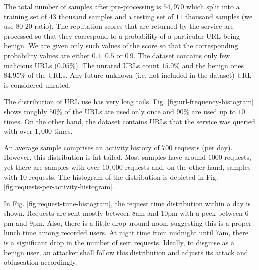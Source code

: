 The total number of samples after pre-processing is $54,970$ which split into a training set of $43$ thousand samples and a testing set of $11$ thousand samples (we use $80$-$20$ ratio). The reputation scores that are returned by the service are processed so that they correspond to a probability of a particular URL being benign. We are given only such values of the score so that the corresponding probability values are either $0.1$, $0.5$ or $0.9$. The dataset contains only few malicious URLs
($0.05\%$). The unrated URLs count $15.0\%$ and the benign ones $84.95\%$ of the URLs. Any future unknown (i.e. not included in the dataset) URL is considered unrated.

The distribution of URL use has very long tails. Fig. \ref{fig:url-frequency-histogram} shows roughly $50 \%$ of the URLs are used only once and $90 \%$ are used up to $10$ times. On the other hand, the dataset contains URLs that the service was queried with over $1,000$ times.

An average sample comprises an activity history of $700$ requests (per day). However, this distribution is fat-tailed. Most samples have around $1000$ requests, yet there are samples with over $10,000$ requests and, on the other hand, samples with $10$ requests. The histogram of the distribution is depicted in Fig. \ref{fig:requests-per-activity-histogram}.

In Fig. \ref{fig:request-time-histogram}, the request time distribution within a day is shown. Requests are sent mostly between $8$am and $10$pm with a peek between $6$pm and $9$pm. Also, there is a little drop around noon, suggesting this is a proper lunch time among recorded users. At night time from midnight until $7$am, there is a significant drop in the number of sent requests. Ideally, to disguise as a benign user, an attacker shall follow this distribution and adjusts its attack and obfuscation accordingly.

